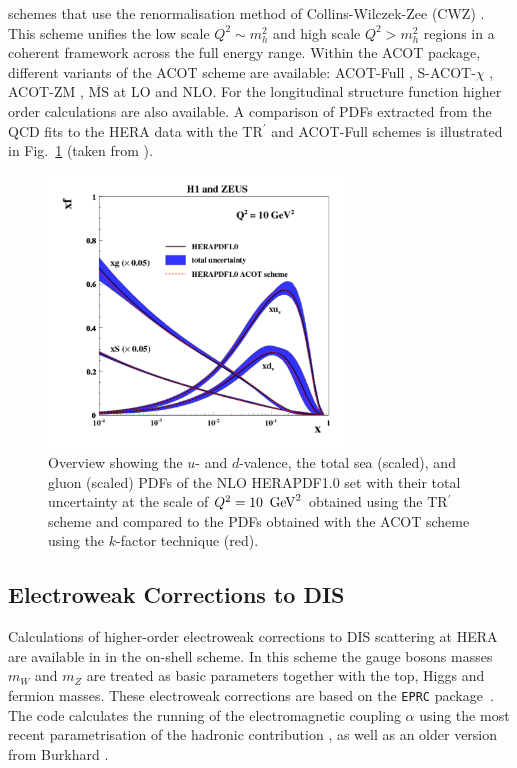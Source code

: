 \begin{itemize}
schemes that use the renormalisation method of Collins-Wilczek-Zee (CWZ) \cite{CWZ}.
This scheme unifies the low scale $Q^2 \sim m_h^2$ and high scale $Q^2 > m_h^2$ regions
in a coherent framework across the full energy range.
%
Within the ACOT package, different variants of the ACOT scheme are available:
ACOT-Full \cite{Aivazis:1993pi}, S-ACOT-$\chi$ \cite{Kramer:2000hn,Kretzer:2003it}, ACOT-ZM \cite{Aivazis:1993pi}, 
$\overline{\text{MS}}$ at LO and NLO. 
For the longitudinal structure function higher order calculations are also available. 
A comparison of PDFs extracted from the QCD fits to the HERA data 
with the TR$^\prime$ and ACOT-Full schemes is illustrated in Fig.~\ref{fig:acotrt} (taken from \cite{h1zeus:2009wt}).

\begin{figure}[!ht]
\centering
\includegraphics[width=8cm]{heraacot}
  \caption{Overview showing the $u$- and $d$-valence, the total sea
    (scaled), and gluon (scaled) PDFs of the NLO HERAPDF1.0 set \cite{h1zeus:2009wt} 
    with their 
    total uncertainty at the scale of $Q^2 = 10\ \GeV^2$ obtained 
    using the TR$^\prime$ scheme and compared to the PDFs obtained with 
    the ACOT scheme using the $k$-factor technique (red).}
 \label{fig:acotrt}
\end{figure}


\end{itemize}

\subsection{Electroweak Corrections to DIS}
Calculations of higher-order electroweak corrections to DIS scattering at 
HERA are available in \fitter in the on-shell scheme. In this scheme the
gauge bosons masses $m_W$ and 
$m_Z$ are treated as basic parameters together with the top, 
Higgs and fermion masses.
These electroweak corrections 
are based on the \texttt{EPRC} package~\cite{SpiesbergerPrivComm}.
The code calculates the running of the electromagnetic coupling $\alpha$ using the most recent parametrisation
of the hadronic contribution
\cite{Jegerlehner}, as well as 
an older version from Burkhard \cite{Burkhard}.




